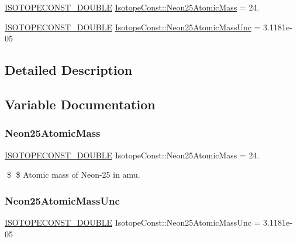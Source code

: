 \begin{DoxyCompactItemize}
\item 
\mbox{\hyperlink{group___isotope_const-_macros_ga8f45a7272ce02c0b4c65c44636ed719a}{I\+S\+O\+T\+O\+P\+E\+C\+O\+N\+S\+T\+\_\+\+D\+O\+U\+B\+LE}} \mbox{\hyperlink{group___isotope_const-_neon-_ne25_gaeee20c10ea70c2a70d3ccb871addc4a3}{Isotope\+Const\+::\+Neon25\+Atomic\+Mass}} = 24.
\item 
\mbox{\hyperlink{group___isotope_const-_macros_ga8f45a7272ce02c0b4c65c44636ed719a}{I\+S\+O\+T\+O\+P\+E\+C\+O\+N\+S\+T\+\_\+\+D\+O\+U\+B\+LE}} \mbox{\hyperlink{group___isotope_const-_neon-_ne25_gaefcf81b3eae6177e4c85455fe20e2d93}{Isotope\+Const\+::\+Neon25\+Atomic\+Mass\+Unc}} = 3.\+1181e-\/05
\end{DoxyCompactItemize}


\subsection{Detailed Description}


\subsection{Variable Documentation}
\mbox{\label{group___isotope_const-_neon-_ne25_gaeee20c10ea70c2a70d3ccb871addc4a3}} 
\subsubsection{\texorpdfstring{Neon25\+Atomic\+Mass}{Neon25AtomicMass}}
{\footnotesize\ttfamily \mbox{\hyperlink{group___isotope_const-_macros_ga8f45a7272ce02c0b4c65c44636ed719a}{I\+S\+O\+T\+O\+P\+E\+C\+O\+N\+S\+T\+\_\+\+D\+O\+U\+B\+LE}} Isotope\+Const\+::\+Neon25\+Atomic\+Mass = 24.}

\$ \$ Atomic mass of Neon-\/25 in amu. \mbox{\label{group___isotope_const-_neon-_ne25_gaefcf81b3eae6177e4c85455fe20e2d93}} 
\subsubsection{\texorpdfstring{Neon25\+Atomic\+Mass\+Unc}{Neon25AtomicMassUnc}}
{\footnotesize\ttfamily \mbox{\hyperlink{group___isotope_const-_macros_ga8f45a7272ce02c0b4c65c44636ed719a}{I\+S\+O\+T\+O\+P\+E\+C\+O\+N\+S\+T\+\_\+\+D\+O\+U\+B\+LE}} Isotope\+Const\+::\+Neon25\+Atomic\+Mass\+Unc = 3.\+1181e-\/05}

